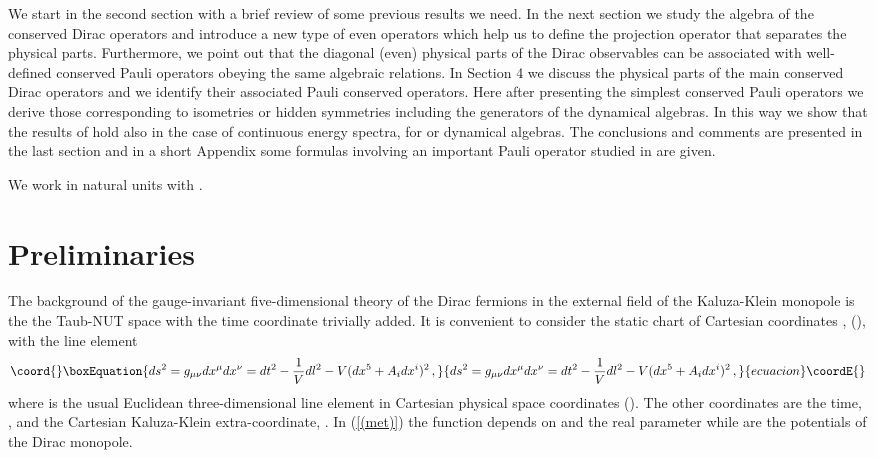 \documentclass[a4paper,12pt]{article}
\begin{document}
We start in the second section with a brief review of some previous results 
\cite{CV2,CV3,CV4} we need. In the next section we study the algebra of the 
conserved Dirac operators and introduce a new type of even operators which 
help us to define the projection operator that separates the physical parts. 
Furthermore, we point out that the diagonal (even) physical parts  of the 
Dirac observables can be associated with well-defined conserved Pauli 
operators obeying the same algebraic relations. In Section 4 we 
discuss the physical parts of the main conserved Dirac operators 
\cite{CV2,CV3,CV4} and we identify their associated Pauli conserved 
operators. Here after presenting the simplest conserved Pauli operators 
we derive those corresponding to isometries or hidden symmetries including 
the generators of the dynamical algebras. In this way we show that the 
results of \cite{CV4} hold also in the case 
of continuous energy spectra, for \coordHE{} or \coordHE{} dynamical algebras.
The conclusions and  comments  are presented in the last section and
in a short Appendix some formulas involving an important Pauli operator 
studied in \cite{JMP,HMH} are given.      
 
We work in natural units with \coordHE{}.

\section{Preliminaries}


The background of the gauge-invariant five-dimensional theory of the Dirac 
fermions in the external field of the Kaluza-Klein monopole \cite{GPS} is 
the the Taub-NUT space with the time coordinate trivially added. It is 
convenient to consider the static chart of Cartesian coordinates \coordHE{}, 
(\coordHE{}), with the line element
\begin{equation}\coord{}\boxEquation{\label{(met)} 
ds^{2}=g_{\mu\nu}dx^{\mu}dx^{\nu}=dt^{2}-\frac{1}{V}dl^{2}-V(dx^{5}+
A_{i}dx^{i})^{2}\,,
}{ds^{2}=g_{\mu\nu}dx^{\mu}dx^{\nu}=dt^{2}-\frac{1}{V}dl^{2}-V(dx^{5}+
A_{i}dx^{i})^{2}\,,
}{ecuacion}\coordE{}\end{equation}   
where \coordHE{}
is the usual Euclidean three-dimensional line element in  
Cartesian physical space coordinates \coordHE{} (\coordHE{}). 
The other coordinates are the time, \coordHE{}, and 
the Cartesian Kaluza-Klein extra-coordinate, \coordHE{}. 
In (\ref{(met)}) the function \coordHE{} 
depends on \coordHE{} and the  
real parameter  \myHighlight{$\mu$}\coordHE{} while \coordHE{} are the potentials of the Dirac 
monopole.  
\end{document}

